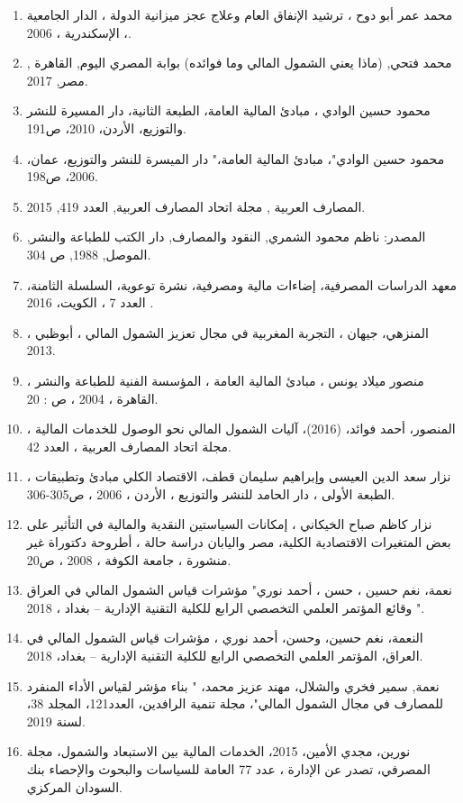 \documentclass[10pt,a4paper]{report}
\begin{document}
\begin{enumerate}
	\item محمد عمر أبو دوح ، ترشيد الإنفاق العام وعلاج عجز ميزانية الدولة ، الدار الجامعية ، الإسكندرية ، 2006.
	\item محمد فتحي, (ماذا يعني الشمول المالي وما فوائده) بوابة المصري اليوم, القاهرة , مصر, 2017.
	\item محمود حسين الوادي ، مبادئ المالية العامة، الطبعة الثانية، دار المسيرة للنشر والتوزيع، الأردن، 2010، ص191.
	\item محمود حسين الوادي"، مبادئ المالية العامة،" دار الميسرة للنشر والتوزيع، عمان، 2006، ص198.
	\item المصارف العربية , مجلة اتحاد المصارف العربية, العدد 419, 2015.
	\item المصدر: ناظم محمود الشمري, النقود والمصارف, دار الكتب للطباعة والنشر, الموصل, 1988, ص 304.
	\item معهد الدراسات المصرفية، إضاءات مالية ومصرفية، نشرة توعوية، السلسلة الثامنة، العدد 7 ، الكويت، 2016 .
	\item المنزهي، جيهان ، التجربة المغربية في مجال تعزيز الشمول المالي ، أبوظبي ، 2013.
	\item منصور ميلاد يونس ، مبادئ المالية العامة ، المؤسسة الفنية للطباعة والنشر ، القاهرة ، 2004 ، ص : 20.
	\item المنصور، أحمد فوائد، (2016)، آليات الشمول المالي نحو الوصول للخدمات المالية ، مجلة اتحاد المصارف العربية ، العدد 42.
	\item نزار سعد الدين العيسى وإبراهيم سليمان قطف، الاقتصاد الكلي مبادئ وتطبيقات ، الطبعة الأولى ، دار الحامد للنشر والتوزيع ، الأردن ، 2006 ، ص305-306.
	\item نزار كاظم صباح الخيكاني ، إمكانات السياستين النقدية والمالية في التأثير على بعض المتغيرات الاقتصادية الكلية، مصر واليابان دراسة حالة ، أطروحة دكتوراة غير منشورة ، جامعة الكوفة ، 2008 ، ص20.
	\item نعمة، نغم حسين ، حسن ، أحمد نوري" مؤشرات قياس الشمول المالي في العراق " وقائع المؤتمر العلمي التخصصي الرابع للكلية التقنية الإدارية – بغداد ، 2018.
	\item النعمة، نغم حسين، وحسن، أحمد نوري ، مؤشرات قياس الشمول المالي في العراق، المؤتمر العلمي التخصصي الرابع للكلية التقنية الإدارية – بغداد، 2018.
	\item نعمة, سمير فخري والشلال، مهند عزيز محمد، " بناء مؤشر لقياس الأداء المنفرد للمصارف في مجال الشمول المالي"، مجلة تنمية الرافدين، العدد121، المجلد 38، لسنة 2019.
	\item نورين، مجدي الأمين، 2015، الخدمات المالية بين الاستبعاد والشمول، مجلة المصرفي، تصدر عن الإدارة ، عدد 77 العامة للسياسات والبحوث والإحصاء بنك السودان المركزي.

\end{enumerate}
\end{document}
